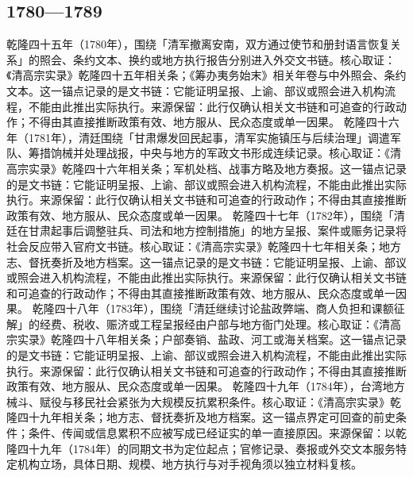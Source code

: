 \subsection{1780—1789}
乾隆四十五年（1780年），围绕「清军撤离安南，双方通过使节和册封语言恢复关系」的照会、条约文本、换约或地方执行报告分别进入外交文书链。核心取证：《清高宗实录》乾隆四十五年相关条；《筹办夷务始末》相关年卷与中外照会、条约文本。这一锚点记录的是文书链：它能证明呈报、上谕、部议或照会进入机构流程，不能由此推出实际执行。来源保留：此行仅确认相关文书链和可追查的行政动作；不得由其直接推断政策有效、地方服从、民众态度或单一因果。
乾隆四十六年（1781年），清廷围绕「甘肃爆发回民起事，清军实施镇压与后续治理」调遣军队、筹措饷械并处理战报，中央与地方的军政文书形成连续记录。核心取证：《清高宗实录》乾隆四十六年相关条；军机处档、战事方略及地方奏报。这一锚点记录的是文书链：它能证明呈报、上谕、部议或照会进入机构流程，不能由此推出实际执行。来源保留：此行仅确认相关文书链和可追查的行政动作；不得由其直接推断政策有效、地方服从、民众态度或单一因果。
乾隆四十七年（1782年），围绕「清廷在甘肃起事后调整驻兵、司法和地方控制措施」的地方呈报、案件或赈务记录将社会反应带入官府文书链。核心取证：《清高宗实录》乾隆四十七年相关条；地方志、督抚奏折及地方档案。这一锚点记录的是文书链：它能证明呈报、上谕、部议或照会进入机构流程，不能由此推出实际执行。来源保留：此行仅确认相关文书链和可追查的行政动作；不得由其直接推断政策有效、地方服从、民众态度或单一因果。
乾隆四十八年（1783年），围绕「清廷继续讨论盐政弊端、商人负担和课额征解」的经费、税收、赈济或工程呈报经由户部与地方衙门处理。核心取证：《清高宗实录》乾隆四十八年相关条；户部奏销、盐政、河工或海关档案。这一锚点记录的是文书链：它能证明呈报、上谕、部议或照会进入机构流程，不能由此推出实际执行。来源保留：此行仅确认相关文书链和可追查的行政动作；不得由其直接推断政策有效、地方服从、民众态度或单一因果。
乾隆四十九年（1784年），台湾地方械斗、赋役与移民社会紧张为大规模反抗累积条件。核心取证：《清高宗实录》乾隆四十九年相关条；地方志、督抚奏折及地方档案。这一锚点界定可回查的前史条件；条件、传闻或信息累积不应被写成已经证实的单一直接原因。来源保留：以乾隆四十九年（1784年）的同期文书为定位起点；官修记录、奏报或外交文本服务特定机构立场，具体日期、规模、地方执行与对手视角须以独立材料复核。
